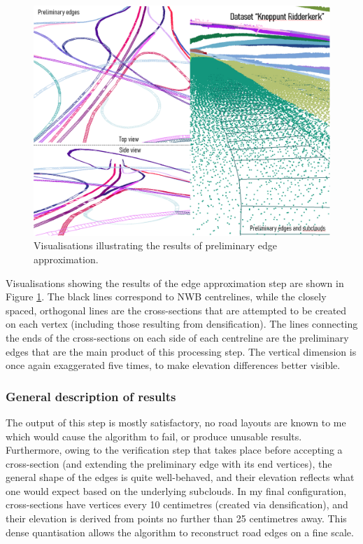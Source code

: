 \begin{figure}
    \centering
    \includegraphics[width=0.9\linewidth]{final_report/figs/edgeapproximation0.png}
    \caption{Visualisations illustrating the results of preliminary edge approximation.}
    \label{fig:edgeapproximation0}
\end{figure}

Visualisations showing the results of the edge approximation step are shown in Figure \ref{fig:edgeapproximation0}. The black lines correspond to NWB centrelines, while the closely spaced, orthogonal lines are the cross-sections that are attempted to be created on each vertex (including those resulting from densification). The lines connecting the ends of the cross-sections on each side of each centreline are the preliminary edges that are the main product of this processing step. The vertical dimension is once again exaggerated five times, to make elevation differences better visible.

\subsubsection{General description of results}

The output of this step is mostly satisfactory, no road layouts are known to me which would cause the algorithm to fail, or produce unusable results. Furthermore, owing to the verification step that takes place before accepting a cross-section (and extending the preliminary edge with its end vertices), the general shape of the edges is quite well-behaved, and their elevation reflects what one would expect based on the underlying subclouds. In my final configuration, cross-sections have vertices every 10 centimetres (created via densification), and their elevation is derived from points no further than 25 centimetres away. This dense quantisation allows the algorithm to reconstruct road edges on a fine scale.

